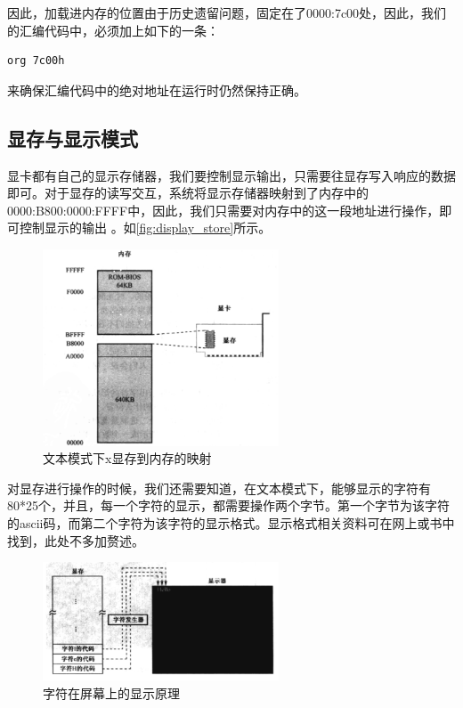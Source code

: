 \documentclass[forprint]{WHUBachelor}
\begin{document}
因此，加载进内存的位置由于历史遗留问题，固定在了0000:7c00处，因此，我们的汇编代码中，必须加上如下的一条：
\begin{lstlisting}
org 7c00h
\end{lstlisting}
来确保汇编代码中的绝对地址在运行时仍然保持正确。


\subsection{显存与显示模式}

显卡都有自己的显示存储器，我们要控制显示输出，只需要往显存写入响应的数据即可。对于显存的读写交互，系统将显示存储器映射到了内存中的0000:B800:0000:FFFF中，因此，我们只需要对内存中的这一段地址进行操作，即可控制显示的输出\cite{2013x86汇编语言从实模式到保护模式} 。如\autoref{fig:display_store}所示。

\begin{figure}[htp]
  \centering
  \includegraphics[width=7cm]{"./figure/display_store.png"}
  \caption{文本模式下x显存到内存的映射}
  \label{fig:display_store}
\end{figure}

对显存进行操作的时候，我们还需要知道，在文本模式下，能够显示的字符有80*25个，并且，每一个字符的显示，都需要操作两个字节。第一个字节为该字符的ascii码，而第二个字符为该字符的显示格式。显示格式相关资料可在网上或书中找到，此处不多加赘述。

\begin{figure}[htp]
  \centering
  \includegraphics[width=7cm]{"./figure/display_text_mode.png"}
  \caption{字符在屏幕上的显示原理}
  \label{fig:display_text_mode}
\end{figure}
\end{document}
